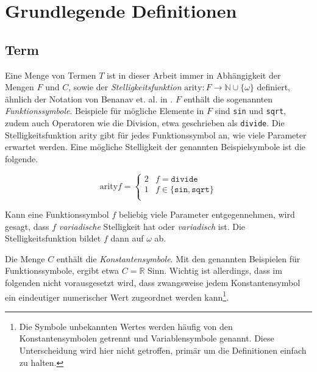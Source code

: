 \documentclass{scrartcl}
\numberwithin{figure}{section} %
\theoremstyle{definition} %
\begin{document}
\section{Grundlegende Definitionen} \label{secGrundlegendeDefinitionen}

\subsection{Term}
Eine Menge von Termen $T$ ist in dieser Arbeit immer  in Abhängigkeit der Mengen $F$ und $C$, sowie der \emph{Stelligkeitsfunktion} $\mathrm{arity} \colon F \rightarrow \mathbb{N} \cup \{\omega\}$ definiert, ähnlich der Notation von Benanav et. al. in \cite{NPHardMatching}. $F$ enthält die sogenannten \emph{Funktionssymbole}. Beispiele für mögliche Elemente in $F$ sind \texttt{sin} und \texttt{sqrt}, zudem auch Operatoren wie die Division, etwa geschrieben als \texttt{divide}. Die Stelligkeitsfunktion $\mathrm{arity}$ gibt für jedes Funktionssymbol an, wie viele Parameter erwartet werden. Eine mögliche Stelligkeit der genannten Beispielsymbole ist die folgende.

$$\mathrm{arity} f = \begin{cases}
2 & f  = \texttt{divide}\\
1 & f \in \{\texttt{sin}, \texttt{sqrt}\}\\
\end{cases}$$

Kann eine Funktionssymbol $f$ beliebig viele Parameter entgegennehmen, wird gesagt, dass $f$ \emph{variadische} Stelligkeit hat oder \emph{variadisch} ist. Die Stelligkeitsfunktion bildet $f$ dann auf $\omega$ ab. 

Die Menge $C$ enthält die \emph{Konstantensymbole}. Mit den genannten Beispielen für Funktionssymbole, ergibt etwa $C = \mathbb R$ Sinn. Wichtig ist allerdings, dass im folgenden nicht vorausgesetzt wird, dass zwangsweise jedem Konstantensymbol ein eindeutiger numerischer Wert zugeordnet werden kann\footnote{Die Symbole unbekannten Wertes werden häufig von den Konstantensymbolen getrennt und Variablensymbole genannt. Diese Unterscheidung wird hier nicht getroffen, primär um die Definitionen einfach zu halten.}.
\end{document}
